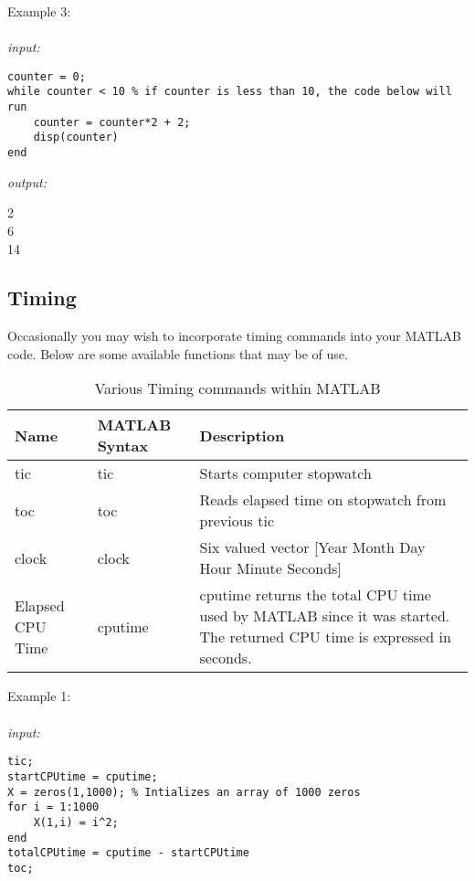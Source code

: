 \documentclass[../MATLAB_Primer.tex]{subfiles}
\begin{document}
Example 3:
\\ \\
\textit{input:}
\begin{lstlisting}[frame=single]
counter = 0;
while counter < 10 % if counter is less than 10, the code below will run
    counter = counter*2 + 2;
    disp(counter)
end
\end{lstlisting}

\textit{output:}

\begin{center}
    2\\ 6\\ 14\\
\end{center}

\subsection{Timing} \label{Timing}
Occasionally you may wish to incorporate timing commands into your MATLAB code. Below are some available functions that may be of use.
\begin{table} [H]
\caption{Various Timing commands within MATLAB}
\begin{center}
\begin{tabular}{| C{1.5cm} |m{3cm} | m{8cm}|}
    \hline
    \textbf{Name} & \textbf{MATLAB Syntax} & \textbf{Description}\\
    \hline
    tic & tic & Starts computer stopwatch\\
    \hline
    toc & toc & Reads elapsed time on stopwatch from previous tic\\
    \hline
    clock & clock & Six valued vector [Year Month Day Hour Minute Seconds]\\
    \hline
    Elapsed CPU Time & cputime & cputime returns the total CPU time used by MATLAB since it was started. The returned CPU time is expressed in seconds.\\
    \hline
\end{tabular}
\end{center}
\label{tab: timing}
\end{table}

Example 1:
\\ \\
\textit{input:}
\begin{lstlisting}[frame=single]
tic;
startCPUtime = cputime;
X = zeros(1,1000); % Intializes an array of 1000 zeros
for i = 1:1000
    X(1,i) = i^2;
end
totalCPUtime = cputime - startCPUtime
toc;
\end{lstlisting}
\end{document}

